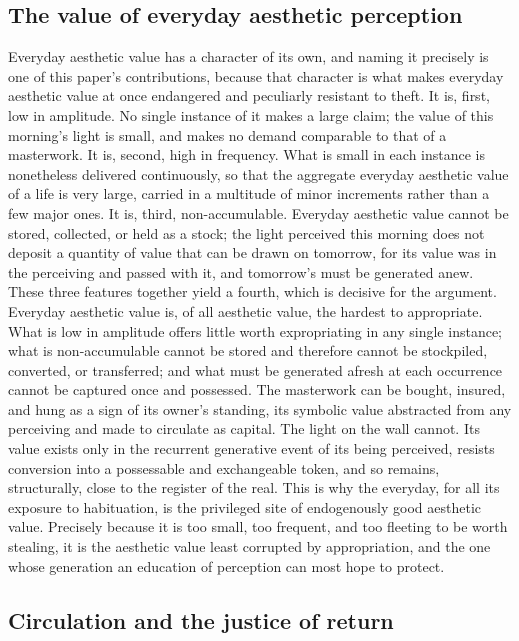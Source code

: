 \subsection{The value of everyday aesthetic perception}
\label{p23:sub:val-everyday}

Everyday aesthetic value has a character of its own, and naming it precisely is one of this paper's contributions, because that character is what makes everyday aesthetic value at once endangered and peculiarly resistant to theft. It is, first, low in amplitude. No single instance of it makes a large claim; the value of this morning's light is small, and makes no demand comparable to that of a masterwork. It is, second, high in frequency. What is small in each instance is nonetheless delivered continuously, so that the aggregate everyday aesthetic value of a life is very large, carried in a multitude of minor increments rather than a few major ones. It is, third, non-accumulable. Everyday aesthetic value cannot be stored, collected, or held as a stock; the light perceived this morning does not deposit a quantity of value that can be drawn on tomorrow, for its value was in the perceiving and passed with it, and tomorrow's must be generated anew. These three features together yield a fourth, which is decisive for the argument. Everyday aesthetic value is, of all aesthetic value, the hardest to appropriate. What is low in amplitude offers little worth expropriating in any single instance; what is non-accumulable cannot be stored and therefore cannot be stockpiled, converted, or transferred; and what must be generated afresh at each occurrence cannot be captured once and possessed. The masterwork can be bought, insured, and hung as a sign of its owner's standing, its symbolic value abstracted from any perceiving and made to circulate as capital. The light on the wall cannot. Its value exists only in the recurrent generative event of its being perceived, resists conversion into a possessable and exchangeable token, and so remains, structurally, close to the register of the real. This is why the everyday, for all its exposure to habituation, is the privileged site of endogenously good aesthetic value. Precisely because it is too small, too frequent, and too fleeting to be worth stealing, it is the aesthetic value least corrupted by appropriation, and the one whose generation an education of perception can most hope to protect.

\subsection{Circulation and the justice of return}
\label{p23:sub:val-circulation}

